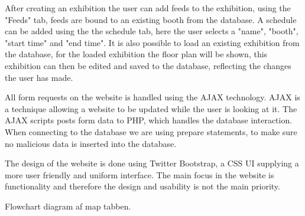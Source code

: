 After creating an exhibition the user can add feeds to the exhibition, using the "Feeds" tab, feeds are bound to an existing booth from the database. A schedule can be added using the the schedule tab, here the user selects a "name", "booth", "start time" and "end time".
It is also possible to load an existing exhibition from the database, for the loaded exhibition the floor plan will be shown, this exhibition can then be edited and saved to the database, reflecting the changes the user has made.


All form requests on the website is handled using the AJAX technology\citep{ajax}. AJAX is a technique allowing a website to be updated while the user is looking at it.
The AJAX scripts posts form data to PHP, which handles the database interaction. When connecting to the database we are using prepare statements, to make sure no malicious data is inserted into the database.


The design of the website is done using Twitter Bootstrap\citep{twitterbootstrap}, a CSS UI supplying a more user friendly and uniform interface.
The main focus in the website is functionality and therefore the design and usability is not the main priority.



Flowchart diagram af map tabben.